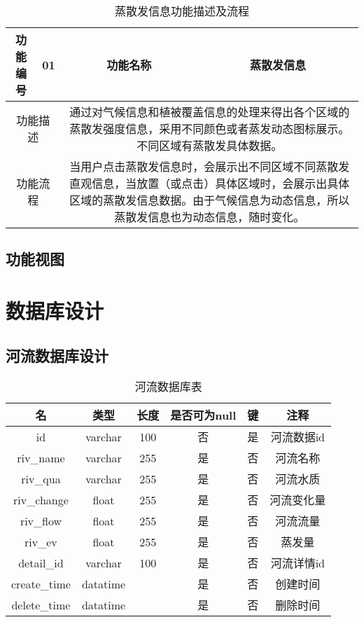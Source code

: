 \begin{table}[H]
	\centering
	\caption[蒸散发信息]{蒸散发信息功能描述及流程}
	\label{5}
	\begin{tabular}{|c|c|c|c|}
		
		\hline
		功能编号&01&功能名称&蒸散发信息\\
		\hline
		\multicolumn{2}{|c|}{功能描述}&\multicolumn{2}{c|}{\multirow{1}{0.7\textwidth}{通过对气候信息和植被覆盖信息的处理来得出各个区域的蒸散发强度信息，采用不同颜色或者蒸发动态图标展示。不同区域有蒸散发具体数据。}}\\[6ex]
		\hline
		\multicolumn{2}{|c|}{功能流程}&\multicolumn{2}{c|}{\multirow{1}{0.7\textwidth}{当用户点击蒸散发信息时，会展示出不同区域不同蒸散发直观信息，当放置（或点击）具体区域时，会展示出具体区域的蒸散发信息数据。由于气候信息为动态信息，所以蒸散发信息也为动态信息，随时变化。}}\\[8ex]
		\hline
		
		
	\end{tabular}
\end{table}




\subsection{功能视图}

\section{数据库设计}

\subsection{河流数据库设计}

\begin{table}[H]
	\centering
	\caption[河流数据]{河流数据库表}
	\begin{tabular}{cccccc}
		\toprule
		名            & 类型      & 长度 &是否可为null & 键 & 注释\\
		\midrule
		id            & varchar  & 100  & 否 & 是 & 河流数据id \\
		riv\_name     & varchar  & 255  &是  & 否 & 河流名称   \\
		riv\_qua      & varchar  & 255  &是  & 否 & 河流水质   \\
		riv\_change   & float    & 255  &是  & 否 & 河流变化量 \\
		riv\_flow     & float    & 255  &是  & 否 & 河流流量   \\
		riv\_ev       & float    & 255  & 是 & 否 & 蒸发量     \\
		detail\_id    & varchar  & 100  & 是 & 否 & 河流详情id \\
		create\_time  & datatime &      &是  & 否 & 创建时间   \\
		delete\_time  &datatime  &      & 是 & 否 & 删除时间   \\ 
		\bottomrule
	\end{tabular}
\end{table}
